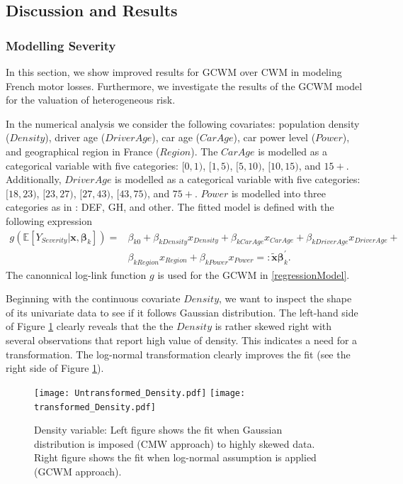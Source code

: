 \documentclass[12pt,letterpaper]{article}
\numberwithin{equation}{section}
\numberwithin{equation}{section}
\numberwithin{equation}{section}
\newcommand{\xTilda}{\tilde{\bm{x}}}
\begin{document}
\subsection{Discussion and Results}
\subsubsection{Modelling Severity}
In this section, we show improved results for GCWM  over CWM in modeling French motor losses. Furthermore, we investigate the results of the GCWM model for the valuation of heterogeneous risk. 

In the numerical analysis we consider the following covariates: population density ($Density$), driver age ($DriverAge$), car age ($CarAge$), car power level ($Power$),  and geographical region in France ($Region$). %
The
$CarAge$ is modelled as a categorical variable with five categories: $[0,1)$, $[1,5)$, $[5,10)$, $[10,15)$, and $15+$. Additionally, $DriverAge$ is modelled as a categorical variable with five categories: $[18,23)$, $[23,27)$, $[27,43)$, $[43,75)$, and $75+$. $Power$ is modelled into three categories as in \cite{Charpentier:2014}:
DEF, GH, and other. The fitted model is defined with the following expression
\begin{align}
g(\mathbb{E}\left[Y_{Severity}|\bm{x},  \bm{\beta}_k  \right]) = 
 & \beta_{k0} +  \beta_{kDensity}x_{Density}+ \beta_{kCar Age} x_{Car Age}+ \beta_{kDriver Age} x_{Driver Age} + \nonumber \\ &  \beta_{kRegion} x_{Region} + \beta_{kPower} x_{Power} \label{regressionModel}  =: \bm{\xTilda} \bm{\beta}_k^{'}.
\end{align}
The canonnical log-link function $g$ is used for the GCWM in \eqref{regressionModel}. 

Beginning with the continuous covariate $Density$, we want to inspect the shape of its univariate data to see if it follows Gaussian distribution. %
The left-hand side of Figure \ref{fig:vet1} clearly reveals that the the $Density$ is rather skewed right with several observations that report high value of density. This indicates a need for a transformation. The log-normal transformation clearly improves the fit (see the right side of Figure \ref{fig:vet1}).
\begin{figure}[!htb]
\begin{center}
\texttt{[image: Untransformed\_Density.pdf]}
\texttt{[image: transformed\_Density.pdf]}
\end{center}
\vspace{-0.2in}
\caption{Density variable: Left figure shows the fit when Gaussian distribution is imposed (CMW approach) to highly skewed data. Right figure shows the fit when log-normal assumption is applied (GCWM approach).}
\label{fig:vet1}
\end{figure}
\end{document}

